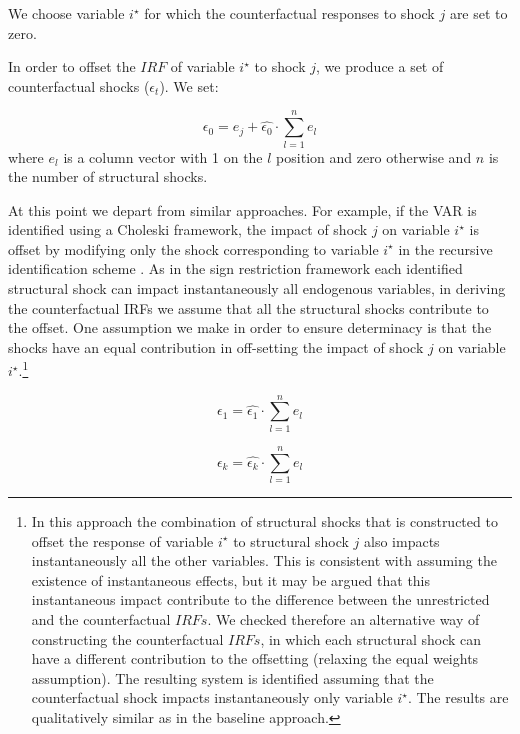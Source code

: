 \documentclass[11pt]{article}
\begin{document}
\begin{appendices}
We choose variable $i^{\star}$ for which the counterfactual responses to shock $j$ are set to zero.

In order to offset the $IRF$ of variable $i^{\star}$ to shock $j$, we produce a set of counterfactual shocks ($\epsilon_{t}$). We set:

\begin{equation}
\epsilon_{0} = e_j + \hat{\epsilon_0} \cdot \sum_{l = 1}^n e_l
\end{equation}
where $e_l$ is a column vector with 1 on the $l$ position and zero otherwise and $n$ is the number of structural shocks.

At this point we depart from similar approaches. For example, if the VAR is identified using a Choleski framework, the impact of shock $j$ on variable $i^{\star}$ is offset by modifying only the shock corresponding to variable $i^{\star}$ in the recursive identification scheme . As in the sign restriction framework each identified structural shock can impact instantaneously all endogenous variables, in deriving the counterfactual IRFs we assume that all the structural shocks contribute to the offset. One assumption we make in order to ensure determinacy is that the shocks have an equal contribution in off-setting the impact of shock $j$ on variable $i^{\star}$.\footnote{In this approach the combination of structural shocks that is constructed to offset the response of variable $i^{\star}$ to structural shock $j$ also impacts instantaneously all the other variables. This is consistent with assuming the existence of instantaneous effects, but it may be argued that this instantaneous impact contribute to the difference between the unrestricted and the counterfactual $IRFs$. We checked therefore an alternative way of constructing the counterfactual $IRFs$, in which each structural shock can have a different contribution to the offsetting (relaxing the equal weights assumption). The resulting system is identified assuming that the counterfactual shock impacts instantaneously only variable $i^{\star}$. The results are qualitatively similar as in the baseline approach.} 

\begin{equation}
\epsilon_{1} = \hat{\epsilon_1} \cdot \sum_{l=1}^n e_l
\end{equation}

\begin{equation}
\epsilon_{k} = \hat{\epsilon_k} \cdot \sum_{l=1}^n e_l
\end{equation}


\end{appendices}
\end{document}
